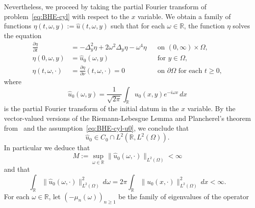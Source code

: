 \documentclass[a4paper, reqno,titlepage]{amsart}
\numberwithin{equation}{section}
\theoremstyle{plain}
\theoremstyle{definition}
\theoremstyle{remark}
\newcommand{\RR}{\mathbb{R}}
\begin{document}
Nevertheless, we proceed by taking the partial Fourier transform of problem~\eqref{eq:BHE-cyl} with respect to the $x$ variable. We obtain a family of functions $\eta(t, \omega, y) := \widehat{u}(t, \omega, y)$ such that for each $\omega \in \RR$, the function $\eta$ solves the equation
\begin{equation}
  \label{eq:eta-eq}
  \begin{aligned}
    \frac{\partial \eta}{\partial t} & = -\Delta_y^2 \eta + 2 \omega^2 \Delta_y \eta - \omega^4 \eta
                                     &                                                               & \text{on } (0, \infty) \times \Omega,                                                          \\
    \eta(0, \omega, y)               & = \widehat{u}_0(\omega,y)
                                     &                                                               & \text{for } y \in \Omega,                                                                      \\
    \eta(t,\omega,\cdot)             & = \frac{\partial \eta}{\partial \nu}(t,\omega,\cdot) = 0      &                                       & \text{on } \partial \Omega \text{ for each } t \geq 0,
  \end{aligned}
\end{equation}
where
\begin{equation*}
  \widehat{u}_0(\omega,y) = \frac{1}{\sqrt{2\pi}}\int_\RR u_0(x,y) e^{-i \omega x} \,d x
\end{equation*}
is the partial Fourier transform of the initial datum in the $x$ variable. By the vector-valued versions of the Riemann-Lebesgue Lemma and Plancherel's theorem from~\cite[Theorems~1.8.1, and~1.8.2]{ABHN} and the assumption~\eqref{eq:BHE-cyl-u0}, we conclude that
\begin{equation}
  \label{eq:u0-hat}
  \widehat{u}_0 \in C_0 \cap L^2(\RR, L^2(\Omega)).
\end{equation}
In particular we deduce that
\begin{equation}
  \label{eq:u0-hat-bounded}
  M:=\sup_{\omega \in \RR} \| \widehat{u}_0(\omega, \cdot) \|_{L^2(\Omega)} < \infty
\end{equation}
and that
\begin{equation}
  \label{eq:u0-hat-plancerel}
  \int_\RR \| \widehat{u}_0(\omega, \cdot) \|^2_{L^2(\Omega)} \, d\omega
  = 2\pi\int_\RR \|u_0(x, \cdot)\|^2_{L^2(\Omega)} \, dx
  < \infty.
\end{equation}
For each $\omega\in\RR$, let $(-\mu_n(\omega))_{n \geq 1}$ be the family of eigenvalues  of the operator
\end{document}
